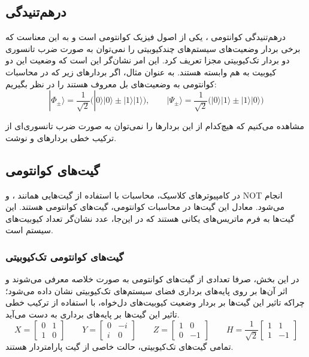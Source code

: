 \subsection{درهم‌تنیدگی}

درهم‌تنیدگی کوانتومی
، یکی از اصول فیزیک کوانتومی است و به این معناست که برخی بردار وضعیت‌های سیستم‌های چندکیوبیتی را نمی‌توان به صورت ضرب تانسوری دو بردار تک‌کیوبیتی مجزا تعریف کرد. این امر نشان‌گر این است که وضعیت این دو کیوبیت به هم وابسته هستند.
به عنوان مثال، اگر بردارهای زیر که در محاسبات کوانتومی به وضعیت‌های بل 
معروف هستند را در نظر بگیریم:
\begin{equation}
|{\Phi_\pm}\rangle = \frac{1}{\sqrt 2}\big(|0\rangle| 0\rangle\pm |1\rangle| 1\rangle\big), \qquad |{\Psi_{\pm}}\rangle=\frac{1}{\sqrt 2}\big(|0\rangle| 1\rangle\pm  |1\rangle|0\rangle\big)
\end{equation}

مشاهده می‌کنیم که هیچ‌کدام از این بردارها را نمی‌توان به صورت ضرب تانسوری‌ای از ترکیب خطی بردارهای
\lr{$|0\rangle$} و \lr{$|1\rangle$}
نوشت.

\subsection{گیت‌های کوانتومی}
در کامپیوترهای کلاسیک، محاسبات با استفاده از گیت‌هایی همانند 
،  و NOT
انجام می‌شود.
معادل این گیت‌ها در محاسبات کوانتومی، گیت‌های کوانتومی هستند. این گیت‌ها به فرم ماتریس‌های یکانی 
هستند که در این‌جا، عدد 
نشان‌گر تعداد کیوبیت‌های سیستم است.

\subsubsection{
    گیت‌های کوانتومی تک‌کیوبیتی
}
در این بخش، صرفا تعدادی از گیت‌های کوانتومی به صورت خلاصه معرفی می‌شوند و اثر آن‌ها بر روی پایه‌های برداری فضای سیستم‌های تک‌کیوبیتی نشان داده می‌شود؛ چراکه تاثیر این گیت‌ها بر بردار وضعیت کیوبیت‌های دل‌خواه، با استفاده از ترکیب خطی تاثیر این گیت‌ها بر پایه‌های برداری به دست می‌آید.
\begin{equation}
X = \begin{bmatrix} 0 & 1 \\ 1 & 0 \end{bmatrix} \qquad
Y = \begin{bmatrix} 0 & -i \\ i & 0 \end{bmatrix} \qquad
Z = \begin{bmatrix} 1 & 0 \\ 0 & -1 \end{bmatrix} \qquad
H = \frac{1}{\sqrt{2}} \begin{bmatrix} 1 & 1 \\ 1 & -1 \end{bmatrix}
\end{equation}
تمامی گیت‌های تک‌کیوبیتی، حالت خاصی از گیت پارامتردار 
هستند.

